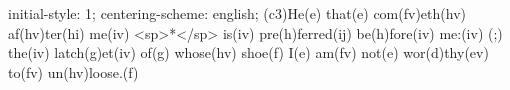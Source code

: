 initial-style: 1;
centering-scheme: english;
(c3)He(e) that(e) com(fv)eth(hv) af(hv)ter(hi) me(iv) <sp>*</sp> is(iv) pre(h)ferred(ij) be(h)fore(iv) me:(iv) (;) the(iv) latch(g)et(iv) of(g) whose(hv) shoe(f) I(e) am(fv) not(e) wor(d)thy(ev) to(fv) un(hv)loose.(f)
